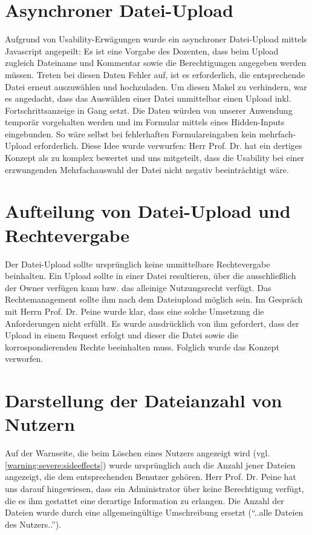 \documentclass[12pt,DIV14,BCOR10mm,a4paper,parskip=half-,headsepline,headinclude,english,ngerman,bibliography=totocnumbered]{scrreprt}
\begin{document}
\section{Asynchroner Datei-Upload}
Aufgrund von Usability-Erwägungen wurde ein asynchroner Datei-Upload mittels Javascript angepeilt: Es ist eine Vorgabe des Dozenten, dass beim Upload zugleich Dateiname und Kommentar sowie die Berechtigungen angegeben werden müssen. Treten bei diesen Daten Fehler auf, ist es erforderlich, die entsprechende Datei erneut auszuwählen und hochzuladen. Um diesen Makel zu verhindern, war es angedacht, dass das Auswählen einer Datei unmittelbar einen Upload inkl. Fortschrittsanzeige in Gang setzt. Die Daten würden von unserer Anwendung temporär vorgehalten werden und im Formular mittels eines Hidden-Inputs eingebunden.
So wäre selbst bei fehlerhaften Formulareingaben kein mehrfach-Upload erforderlich. Diese Idee wurde verwurfen: Herr Prof. Dr. hat ein dertiges Konzept als zu komplex bewertet und uns mitgeteilt, dass die Usability bei einer erzwungenden Mehrfachauswahl der Datei nicht negativ beeinträchtigt wäre.

\section{Aufteilung von Datei-Upload und Rechtevergabe}
Der Datei-Upload sollte ursprünglich keine unmittelbare Rechtevergabe beinhalten. Ein Upload sollte in einer Datei resultieren, über die ausschließlich der Owner verfügen kann bzw. das alleinige Nutzungsrecht verfügt. Das Rechtemanagement sollte ihm nach dem Dateiupload möglich sein. Im Gespräch mit Herrn Prof. Dr. Peine wurde klar, dass eine solche Umsetzung die Anforderungen nicht erfüllt. Es wurde ausdrücklich von ihm gefordert, dass der Upload in einem Request erfolgt und dieser die Datei sowie die korrospondierenden Rechte beeinhalten muss. Folglich wurde das Konzept verworfen.

\section{Darstellung der Dateianzahl von Nutzern}
Auf der Warnseite, die beim Löschen eines Nutzers angezeigt wird (vgl. \ref{warning:severe:sideeffects}) wurde ursprünglich auch die Anzahl jener Dateien angezeigt, die dem entsprechenden Benutzer gehören. Herr Prof. Dr. Peine hat uns darauf hingewiesen, dass ein Administrator über keine Berechtigung verfügt, die es ihm gestattet eine derartige Information zu erlangen. Die Anzahl der Dateien wurde durch eine allgemeingültige Umschreibung ersetzt (\enquote{..alle Dateien des Nutzers..}).
\end{document}

